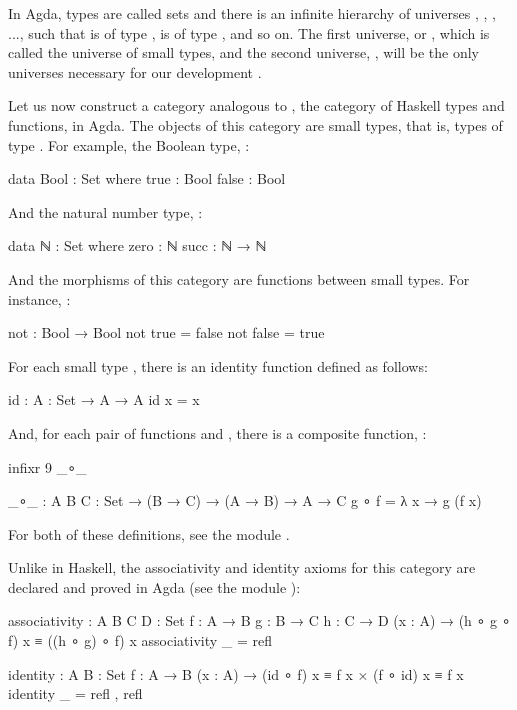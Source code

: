 In Agda, types are called sets and there is an infinite hierarchy of
universes , , , ..., such
that  is of type ,  is of
type , and so on. The first universe, 
or , which is called the universe of small types, and
the second universe, , will be the only universes
necessary for our development \parencite[§ 2.1]{sicardramirez-2014}.

Let us now construct a category analogous to \hask, the category of
Haskell types and functions, in Agda. The objects of this category are
small types, that is, types of type . For example, the
Boolean type, :
\begin{codeagda}
data Bool : Set where
  true  : Bool
  false : Bool
\end{codeagda}
And the natural number type, :
\begin{codeagda}
data ℕ : Set where
  zero : ℕ
  succ : ℕ → ℕ
\end{codeagda}
And the morphisms of this category are functions between small types.
For instance, :
\begin{codeagda}
not : Bool → Bool
not true  = false
not false = true
\end{codeagda}

For each small type , there is an identity function
defined as follows:
\begin{codeagda}
id : {A : Set} → A → A
id x = x
\end{codeagda}
And, for each pair of functions  and , there is a composite function, :
\begin{codeagda}
infixr 9 _∘_

_∘_ : {A B C : Set} → (B → C) → (A → B) → A → C
g ∘ f = λ x → g (f x)
\end{codeagda}
For both of these definitions, see the module .

Unlike in Haskell, the associativity and identity axioms for this
category are declared and proved in Agda (see the module
):
\begin{codeagda}
associativity : {A B C D : Set} {f : A → B} {g : B → C} {h : C → D}
                (x : A) → (h ∘ g ∘ f) x ≡ ((h ∘ g) ∘ f) x
associativity _ = refl

identity : {A B : Set} {f : A → B}
           (x : A) → (id ∘ f) x ≡ f x × (f ∘ id) x ≡ f x
identity _ = refl , refl
\end{codeagda}

